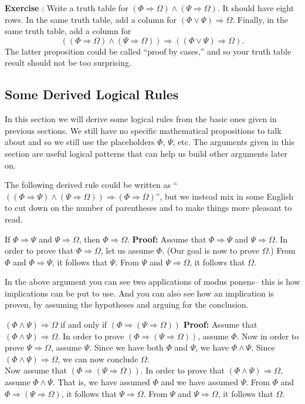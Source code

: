 \documentclass[12pt]{article}
\newcommand{\AND}{\wedge}
\newcommand{\OR}{\vee}
\newcommand{\ARR}{\Rightarrow}
\newcounter{exercise}
\newcounter{rule}
\def\putExerciseHeading{\refstepcounter{exercise} \textbf{Exercise \theexercise}}
\def\putRuleNumber{\refstepcounter{rule}\therule}
\newcommand{\ex}[1]{ \putExerciseHeading: #1}
\newcommand{\DRULEPF}[3]{\begin{tcolorbox}[title=Derived Rule \putRuleNumber: #1,colbacktitle=white,coltitle=black,colback=white] {#2} \tcblower \textbf{Proof:} {#3} \end{tcolorbox}}
\def\pA{\Phi}
\def\pB{\Psi}
\def\pC{\Omega}
\begin{document}
\ex{
Write a truth table for $(\pA\ARR\pC)\AND(\pB\ARR\pC)$. It should have eight rows.
In the same truth table, add a column for $(\pA\OR\pB)\ARR\pC$.
Finally, in the same truth table, add a column for 
$$((\pA\ARR\pC)\AND(\pB\ARR\pC))\ARR((\pA\OR\pB)\ARR\pC).$$
The latter proposition could be called ``proof by cases,'' and so your truth table result should not be too surprising.
}

\subsection{Some Derived Logical Rules}
\label{sec:derived1}

In this section we will derive some logical rules from the basic ones given in previous sections.
We still have no specific mathematical propositions to talk about and so we still use the placeholders $\pA$, $\pB$, etc.
The arguments given in this section are useful logical patterns that can help us build other arguments later on.

The following derived rule could be written as ``$((\pA\ARR\pB)\AND(\pB\ARR\pC))\ARR(\pA\ARR\pC)$'',
but we instead mix in some English to cut down on the number of parentheses and to make things more pleasant to read.

\DRULEPF{Transitivity of Implication}{
If $\pA\ARR\pB$ and $\pB\ARR\pC$, then $\pA\ARR\pC$.
}{
Assume that $\pA\ARR\pB$ and $\pB\ARR\pC$.
In order to prove that $\pA\ARR\pC$, let us assume $\pA$.
(Our goal is now to prove $\pC$.)
From $\pA$ and $\pA\ARR\pB$, it follows that $\pB$.
From $\pB$ and $\pB\ARR\pC$, it follows that $\pC$.
}

In the above argument you can see two applications of modus ponens-- this is how implications can be put to use.
And you can also see how an implication is proven, by assuming the hypotheses and arguing for the conclusion.

\def\lsp{\\[-0.4em]}

\DRULEPF{Conjunction and Implication}{
$(\pA\AND\pB)\ARR\pC$ if and only if $(\pA\ARR(\pB\ARR\pC))$
}{
Assume that $(\pA\AND\pB)\ARR\pC$.
In order to prove $(\pA\ARR(\pB\ARR\pC))$, assume $\pA$.
Now in order to prove $\pB\ARR\pC$, assume $\pB$.
Since we have both $\pA$ and $\pB$, we have $\pA\AND\pB$.
Since $(\pA\AND\pB)\ARR\pC$, we can now conclude $\pC$.\lsp

Now assume that $(\pA\ARR(\pB\ARR\pC))$.
In order to prove that $(\pA\AND\pB)\ARR\pC$,
assume $\pA\AND\pB$.
That is, we have assumed $\pA$ and we have assumed $\pB$.
From $\pA$ and $\pA\ARR(\pB\ARR\pC)$, it follows that $\pB\ARR\pC$.
From $\pB$ and $\pB\ARR\pC$, it follows that $\pC$.
}
\end{document}
